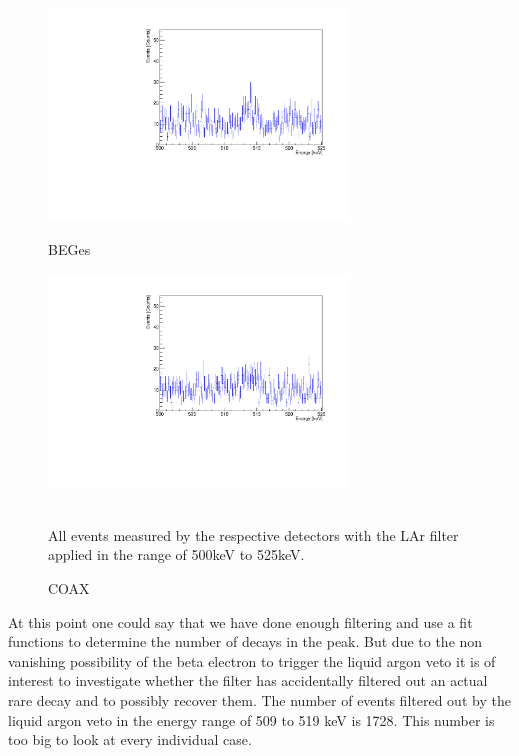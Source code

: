 \begin{figure}[t!]
\centering
\begin{minipage}{.5\textwidth}
  \centering
	\includegraphics[width=80mm]{./Bilder/500525LArVetoBEGes.pdf}
    \caption{BEGes}
  \label{fig:LArBEGes}
\end{minipage}%
\begin{minipage}{.5\textwidth}
  \centering
	\includegraphics[width=80mm]{./Bilder/500525LArVetoCOAX.pdf}
  \caption{COAX}
  \label{fig:LArCOAX}
\end{minipage}
    \\
	\vspace{0.5cm}
    All events measured by the respective detectors with the LAr filter applied in the range of 500keV to 525keV.
\end{figure}

At this point one could say that we have done enough filtering and use a fit functions to determine the number of decays in the peak.
But due to the non vanishing possibility of the beta electron to trigger the liquid argon veto it is of interest to investigate whether the filter has accidentally filtered out an actual rare  decay and to possibly recover them.
The number of events filtered out by the liquid argon veto in the energy range of 509 to 519 keV is 1728.
This number is too big to look at every individual case.
\\

